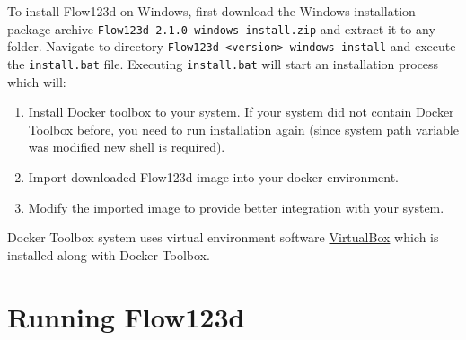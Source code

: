 \documentclass[12pt,a4paper]{report}
\begin{document}
To install Flow123d on Windows, first download the Windows installation package archive \verb'Flow123d-2.1.0-windows-install.zip' and extract it to any folder.
Navigate to directory \verb'Flow123d-<version>-windows-install' and execute the \verb'install.bat' file.
Executing \verb'install.bat' will start an installation process which will:
\begin{enumerate}
	\item Install \href{https://www.docker.com/products/docker-toolbox}{Docker toolbox} to your system.
	If your system did not contain Docker Toolbox before, you need to run installation again (since system path variable was modified new shell is required).
	\item Import downloaded Flow123d image into your docker environment.
	\item Modify the imported image to provide better integration with your system.
\end{enumerate}

Docker Toolbox system uses virtual environment software \href{https://www.virtualbox.org/}{VirtualBox} which 
is installed along with Docker Toolbox.

\section{Running Flow123d}
\end{document}
